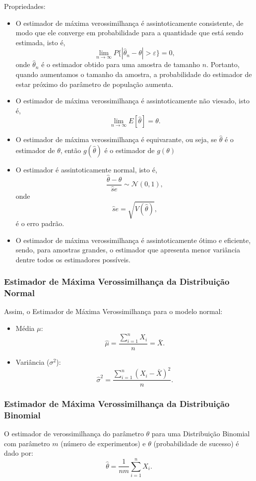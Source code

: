 \documentclass{article}
\begin{document}
Propriedades:
\begin{itemize}
    \item O estimador de máxima verossimilhança é assintoticamente consistente, de modo que ele converge em probabilidade para a quantidade que está sendo estimada, isto é,
        $$
        \lim_{n \to \infty} P\{|\hat{\theta}_n - \theta| > \varepsilon\} = 0,
        $$
    onde $\hat{\theta}_n$ é o estimador obtido para uma amostra de tamanho $n$. Portanto, quando aumentamos o tamanho da amostra, a probabilidade do estimador de estar próximo do parâmetro de população aumenta.
    \item O estimador de máxima verossimilhança é assintoticamente não viesado, isto é,
        $$
        \lim_{n \to \infty} E[\hat{\theta}] = \theta.
        $$
    \item O estimador de máxima verossimilhança é equivarante, ou seja, se $\hat{\theta}$ é o estimador de $\theta$, então $g(\hat{\theta})$ é o estimador de $g(\theta)$
    \item O estimador é assintoticamente normal, isto é,
        $$
        \frac{\hat{\theta} - \theta}{\hat{s}e} \sim \mathcal{N}(0,1),
        $$
    onde
        $$
        \hat{s}e = \sqrt{V(\hat{\theta})},
        $$
    é o erro padrão.
    \item O estimador de máxima verossimilhança é assintoticamente ótimo e eficiente, sendo, para amostras grandes, o estimador que apresenta menor variância dentre todos os estimadores possíveis.
\end{itemize}

\subsubsection{Estimador de Máxima Verossimilhança da Distribuição Normal}
Assim, o Estimador de Máxima Verossimilhança para o modelo normal:
\begin{itemize}
    \item Média $\mu$:
    $$
    \hat{\mu} = \frac{\sum_{i=1}^n X_i}{n} = \bar{X}.
    $$
    \item Variância ($\sigma^2$):
    $$
    \hat{\sigma}^2 = \frac{\sum_{i=1}^n (X_i - \bar{X})^2}{n}.
    $$
\end{itemize}

\subsubsection{Estimador de Máxima Verossimilhança da Distribuição Binomial}
O estimador de verossimilhança do parâmetro $\theta$ para uma Distribuição Binomial com parâmetro $m$ (número de experimentos) e $\theta$ (probabilidade de sucesso) é dado por:
    $$
    \hat{\theta} = \frac{1}{nm} \sum_{i=1}^n X_i.
    $$
    
\end{document}

